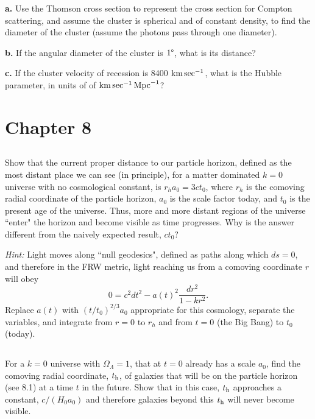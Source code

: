 \documentclass[12pt]{article}
\begin{document}
\textbf{a.} Use the Thomson cross section to represent the cross section for Compton scattering, and assume the cluster is spherical and of constant density, to find the diameter of the cluster (assume the photons pass through one diameter).

\textbf{b.} If the angular diameter of the cluster is \(1 \degree\), what is its distance?

\textbf{c.} If the cluster velocity of recession is 8400 \(\mathrm{km}\sec^{-1}\), what is the Hubble parameter, in units of of \(\mathrm{km}\sec^{-1}\mathrm{Mpc}^{-1}\)?

\setcounter{section}{8}
\setcounter{subsection}{0}

\section*{Chapter 8}

\subsection{} %

Show that the current proper distance to our particle horizon, defined as the most distant place we can see (in principle), for a matter dominated \(k=0\) universe with no cosmological constant, is \(r_h a_0 = 3ct_0\), where \(r_h\) is the comoving radial coordinate of the particle horizon, \(a_0\) is the scale factor today, and \(t_0\) is the present age of the universe. Thus, more and more distant regions of the universe ``enter" the horizon and become visible as time progresses. Why is the answer different from the naively expected result, \(ct_0\)?

\textit{Hint:} Light moves along ``null geodesics", defined as paths along which \(ds = 0\), and therefore in the FRW metric, light reaching us from a comoving coordinate \(r\) will obey
\[0 = c^2dt^2-a(t)^2\frac{dr^2}{1-kr^2}.
\]
Replace \(a(t)\) with \( (t/t_0)^{2/3}a_0\) appropriate for this cosmology, separate the variables, and integrate from \(r=0\) to \(r_h\) and from \(t=0\) (the Big Bang) to \(t_0\) (today).

\subsection{} %

For a \(k=0\) universe with \(\Omega_\Lambda = 1\), that at \(t=0\) already has a scale \(a_0\), find the comoving radial coordinate, \(t_\mathrm{h}\), of galaxies that will be on the particle horizon (see 8.1) at a time \(t\) in the future. Show that in this case, \(t_\mathrm{h}\) approaches a constant, \(c/(H_0a_0)\) and therefore galaxies beyond this \(t_\mathrm{h}\) will never become visible.
\end{document}
